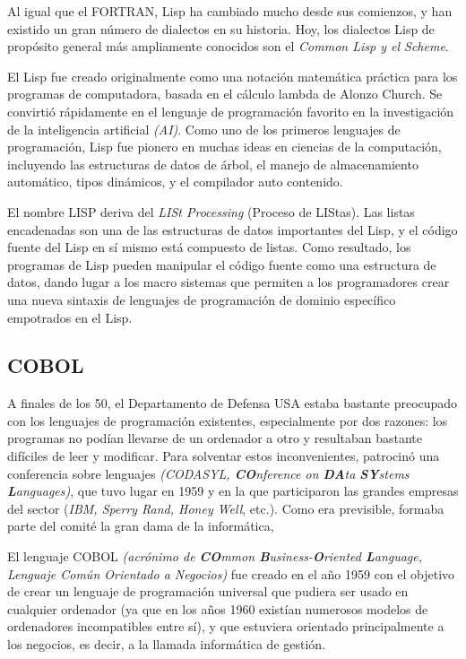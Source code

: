 \documentclass[twoside,twocolumn]{article}
\begin{document}
Al igual que el FORTRAN, Lisp ha cambiado mucho desde sus comienzos, y han existido un gran número de dialectos en su historia. Hoy, los dialectos Lisp de propósito general más ampliamente conocidos son el \textit{Common Lisp y el Scheme}.

El Lisp fue creado originalmente como una notación matemática práctica para los programas de computadora, basada en el cálculo lambda de Alonzo Church. Se convirtió rápidamente en el lenguaje de programación favorito en la investigación de la inteligencia artificial \textit{(AI)}. Como uno de los primeros lenguajes de programación, Lisp fue pionero en muchas ideas en ciencias de la computación, incluyendo las estructuras de datos de árbol, el manejo de almacenamiento automático, tipos dinámicos, y el compilador auto contenido.

El nombre LISP deriva del \textit{LISt Processing} (Proceso de LIStas). Las listas encadenadas son una de las estructuras de datos importantes del Lisp, y el código fuente del Lisp en sí mismo está compuesto de listas. Como resultado, los programas de Lisp pueden manipular el código fuente como una estructura de datos, dando lugar a los macro sistemas que permiten a los programadores crear una nueva sintaxis de lenguajes de programación de dominio específico empotrados en el Lisp.

\subsection{COBOL}

A finales de los 50, el Departamento de Defensa
USA estaba bastante preocupado con los lenguajes de
programación existentes, especialmente por dos razones: los programas no podían llevarse de un ordenador
a otro y resultaban bastante difíciles de leer y modificar.
Para solventar estos inconvenientes, patrocinó una
conferencia sobre lenguajes \textit{(CODASYL, \textbf{CO}nference
on \textbf{DA}ta \textbf{SY}stems \textbf{L}anguages)}, que tuvo lugar en 1959
y en la que participaron las grandes empresas del sector (\textit{IBM, Sperry Rand, Honey Well}, etc.). Como era
previsible, formaba parte del comité la gran dama de la
informática,

El lenguaje COBOL \textit{(acrónimo de \textbf{CO}mmon \textbf{B}usiness-\textbf{O}riented \textbf{L}anguage, Lenguaje Común Orientado a Negocios)} fue creado en el año 1959 con el objetivo de crear un lenguaje de programación universal que pudiera ser usado en cualquier ordenador (ya que en los años 1960 existían numerosos modelos de ordenadores incompatibles entre sí), y que estuviera orientado principalmente a los negocios, es decir, a la llamada informática de gestión.
\end{document}
